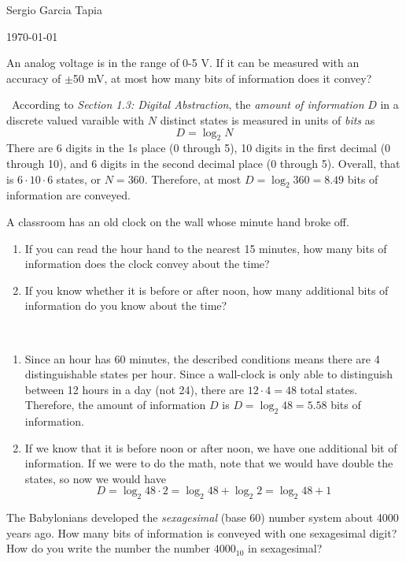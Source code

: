 \documentclass[12pt]{article}
\newenvironment{ex}[2][Exercise]{\begin{trivlist}
		\item[\hskip \labelsep {\bfseries #1}\hskip \labelsep {\bfseries #2.}]}{\end{trivlist}}
\newenvironment{sol}[1][Solution]{\begin{trivlist}
		\item[\hskip \labelsep {\bfseries #1:}]}{\end{trivlist}}
\begin{document}

\noindent Sergio Garcia Tapia \hfill

 \hfill 

\noindent\today

\begin{ex}{1.4} 
An analog voltage is in the range of 0-5 V. If it can be measured with an accuracy of $\pm$50 mV, at most how many bits of information does it convey?
\end{ex}

\begin{sol}\
	According to \emph{Section 1.3: Digital Abstraction}, the \emph{amount of information} $D$ in a discrete valued varaible with $N$ distinct states is measured in units of \emph{bits} as
	\[D=\log_2N \]
	There are 6 digits in the 1s place (0 through 5), 10 digits in the first decimal (0 through 10), and 6 digits in the second decimal place (0 through 5). Overall, that is $6\cdot 10\cdot 6$ states, or $N=360$. Therefore, at most $D=\log_2{360}=8.49$ bits of information are conveyed.
\end{sol}

\begin{ex}{1.5}
	A classroom has an old clock on the wall whose minute hand broke off.
	\begin{enumerate}[label=(\alph*)]
		\item If you can read the hour hand to the nearest 15 minutes, how many bits of information does the clock convey about the time?
		\item If you know whether it is before or after noon, how many additional bits of information do you know about the time?
	\end{enumerate}
\end{ex}
\begin{sol}\
	\begin{enumerate}[label=(\alph*)]
		\item Since an hour has 60 minutes, the described conditions means there are 4 distinguishable states per hour. Since a wall-clock is only able to distinguish between 12 hours in a day (not 24), there are $12\cdot 4=48$ total states. Therefore, the amount of information $D$ is $D=\log_2{48}=5.58$ bits of information.
		\item If we know that it is before noon or after noon, we have one additional bit of information. If we were to do the math, note that we would have double the states, so now we would have
		\[
		D=\log_2{48\cdot 2}=\log_2{48}+\log_2{2}=\log_2{48}+1
		\]
	\end{enumerate}
\end{sol}
\begin{ex}{1.6}
	The Babylonians developed the \emph{sexagesimal} (base 60) number system about 4000 years ago. How many bits of information is conveyed with one sexagesimal digit? How do you write the number the number $4000_{10}$ in sexagesimal?
\end{ex}
\end{document}
